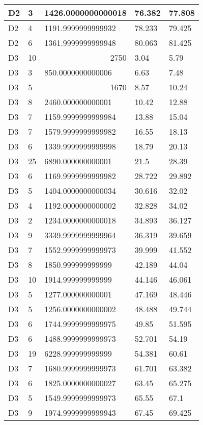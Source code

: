 \begin{longtable}{|l|l|l|l|l|}
D2 & 3 & 1426.0000000000018 & 76.382 & 77.808 \\ \hline
D2 & 4 & 1191.9999999999932 & 78.233 & 79.425 \\ \hline
D2 & 6 & 1361.9999999999948 & 80.063 & 81.425 \\ \hline
D3 & 10 & \multicolumn{1}{r|}{2750} & 3.04 & 5.79 \\ \hline
D3 & 3 & 850.0000000000006 & 6.63 & 7.48 \\ \hline
D3 & 5 & \multicolumn{1}{r|}{1670} & 8.57 & 10.24 \\ \hline
D3 & 8 & 2460.000000000001 & 10.42 & 12.88 \\ \hline
D3 & 7 & 1159.9999999999984 & 13.88 & 15.04 \\ \hline
D3 & 7 & 1579.9999999999982 & 16.55 & 18.13 \\ \hline
D3 & 6 & 1339.9999999999998 & 18.79 & 20.13 \\ \hline
D3 & 25 & 6890.000000000001 & 21.5 & 28.39 \\ \hline
D3 & 6 & 1169.9999999999982 & 28.722 & 29.892 \\ \hline
D3 & 5 & 1404.0000000000034 & 30.616 & 32.02 \\ \hline
D3 & 4 & 1192.0000000000002 & 32.828 & 34.02 \\ \hline
D3 & 2 & 1234.0000000000018 & 34.893 & 36.127 \\ \hline
D3 & 9 & 3339.9999999999964 & 36.319 & 39.659 \\ \hline
D3 & 7 & 1552.9999999999973 & 39.999 & 41.552 \\ \hline
D3 & 8 & 1850.999999999999 & 42.189 & 44.04 \\ \hline
D3 & 10 & 1914.999999999999 & 44.146 & 46.061 \\ \hline
D3 & 5 & 1277.000000000001 & 47.169 & 48.446 \\ \hline
D3 & 5 & 1256.0000000000002 & 48.488 & 49.744 \\ \hline
D3 & 6 & 1744.9999999999975 & 49.85 & 51.595 \\ \hline
D3 & 6 & 1488.9999999999973 & 52.701 & 54.19 \\ \hline
D3 & 19 & 6228.999999999999 & 54.381 & 60.61 \\ \hline
D3 & 7 & 1680.9999999999973 & 61.701 & 63.382 \\ \hline
D3 & 6 & 1825.0000000000027 & 63.45 & 65.275 \\ \hline
D3 & 5 & 1549.9999999999973 & 65.55 & 67.1 \\ \hline
D3 & 9 & 1974.9999999999943 & 67.45 & 69.425 \\ \hline

\end{longtable}

